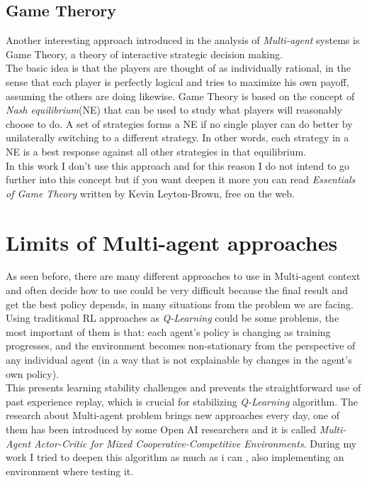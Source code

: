 \documentclass[]{report}
\begin{document}
\subsection{Game Therory}
Another interesting approach introduced in the analysis of \emph{Multi-agent} systems is Game Theory, a theory of interactive strategic decision making.\\
The basic idea is that the players are thought of as individually rational, in the sense that each player is perfectly logical and tries to maximize his own payoff, assuming the others are doing likewise.
Game Theory is based on the concept of \emph{Nash equilibrium}(NE) that can be used to study what players will reasonably choose to do. A set of strategies forms a NE if no single player can do better by unilaterally switching to a different strategy. In other words, each strategy in a NE is a best response against all other strategies in that equilibrium.\\
In this work I don't use this approach and for this reason I do not intend to go further into this concept but if you want deepen it more you can read \emph{Essentials of Game Theory} written by Kevin Leyton-Brown, free on the web.

\section{Limits of Multi-agent approaches}
As seen before, there are many different approaches to use in Multi-agent context and often decide how to use could be very difficult because the final result and get the best policy depends, in many situations from the problem we are facing.\\
Using traditional RL approaches as \emph{Q-Learning} could be some problems, the most important of them is that: each agent’s policy is changing as training progresses, and the environment becomes non-stationary from the perspective of any individual agent (in a way that is not explainable by changes in the agent’s own policy).\\
This presents learning stability challenges and prevents the straightforward use of past experience replay, which is crucial for stabilizing \emph{Q-Learning} algorithm.
The research about Multi-agent problem brings new approaches every day, one of them has been introduced by some Open AI researchers and it is called \emph{Multi-Agent Actor-Critic for Mixed Cooperative-Competitive Environments}.
During my work I tried to deepen this algorithm as much as i can , also implementing an environment where testing it.
\end{document}
